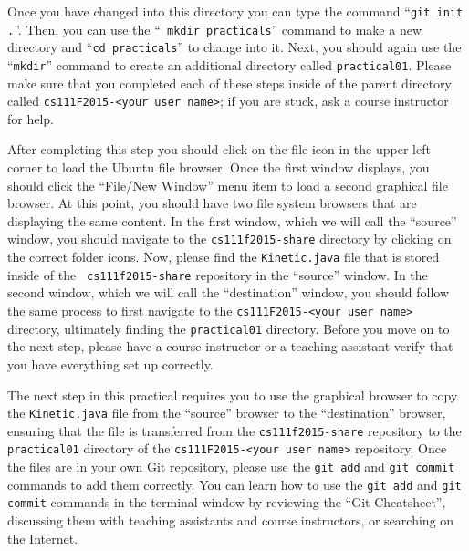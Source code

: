 
Once you have changed into this directory you can type the command ``{\tt git init .}''. Then, you can use the ``{\tt
  mkdir practicals}'' command to make a new directory and ``{\tt cd practicals}'' to change into it.  Next, you
should again use the ``{\tt mkdir}'' command to create an additional directory called {\tt practical01}.  Please make
sure that you completed each of these steps inside of the parent directory called {\tt cs111F2015-<your user name>}; if
you are stuck, ask a course instructor for help.

After completing this step you should click on the file icon in the upper left corner to load the Ubuntu file browser.
Once the first window displays, you should click the ``File/New Window'' menu item to load a second graphical file
browser. At this point, you should have two file system browsers that are displaying the same content.  In the first
window, which we will call the ``source'' window, you should navigate to the {\tt cs111f2015-share} directory by
clicking on the correct folder icons.  Now, please find the {\tt Kinetic.java} file that is stored inside of the {\tt
  cs111f2015-share} repository in the ``source'' window. In the second window, which we will call the ``destination''
window, you should follow the same process to first navigate to the {\tt cs111F2015-<your user name>} directory,
ultimately finding the {\tt practical01} directory. Before you move on to the next step, please have a course instructor
or a teaching assistant verify that you have everything set up correctly.

The next step in this practical requires you to use the graphical browser to copy the {\tt Kinetic.java} file from the
``source'' browser to the ``destination'' browser, ensuring that the file is transferred from the {\tt cs111f2015-share}
repository to the {\tt practical01} directory of the {\tt cs111F2015-<your user name>} repository.  Once the files are
in your own Git repository, please use the {\tt git add} and {\tt git commit} commands to add them correctly. You can learn how to use the {\tt git add} and {\tt git commit} commands in the terminal window by reviewing the ``Git Cheatsheet'', discussing them with teaching assistants and course instructors, or searching on the Internet.

